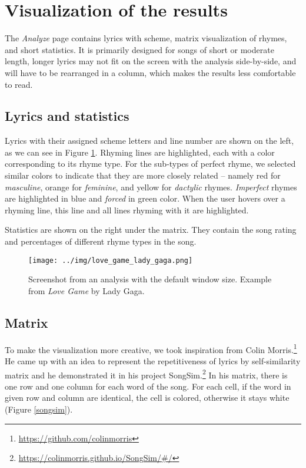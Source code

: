 \section{Visualization of the results}
The \textit{Analyze} page contains lyrics with scheme, matrix visualization of rhymes, and short statistics. It is primarily designed for songs of short or moderate length, longer lyrics may not fit on the screen with the analysis side-by-side, and will have to be rearranged in a column, which makes the results less comfortable to read.

\subsection{Lyrics and statistics}\label{sec-lyrics_and_stats}
Lyrics with their assigned scheme letters and line number are shown on the left, as we can see in Figure \ref{web-analysis_window5}. Rhyming lines are highlighted, each with a color corresponding to its rhyme type. For the sub-types of perfect rhyme, we selected similar colors to indicate that they are more closely related -- namely red for \textit{masculine}, orange for \textit{feminine}, and yellow for \textit{dactylic} rhymes. \textit{Imperfect} rhymes are highlighted in blue and \textit{forced} in green color. When the user hovers over a rhyming line, this line and all lines rhyming with it are highlighted.

Statistics are shown on the right under the matrix. They contain the song rating and percentages of different rhyme types in the song.

\begin{figure}[h]\centering
	\texttt{[image: ../img/love\_game\_lady\_gaga.png]}
	\caption[Screenshot from an analysis with the default window size.]{Screenshot from an analysis with the default window size. Example from \textit{Love Game} by Lady Gaga.}
	\label{web-analysis_window5}
\end{figure}

\subsection{Matrix}\label{visualization-matrix}
To make the visualization more creative, we took inspiration from Colin Morris.\footnote{\url{https://github.com/colinmorris}} He came up with an idea to represent the repetitiveness of lyrics by self-similarity matrix and he demonstrated it in his project SongSim.\footnote{\url{https://colinmorris.github.io/SongSim/\#/}} In his matrix, there is one row and one column for each word of the song. For each cell, if the word in given row and column are identical, the cell is colored, otherwise it stays white (Figure \ref{songsim}).

